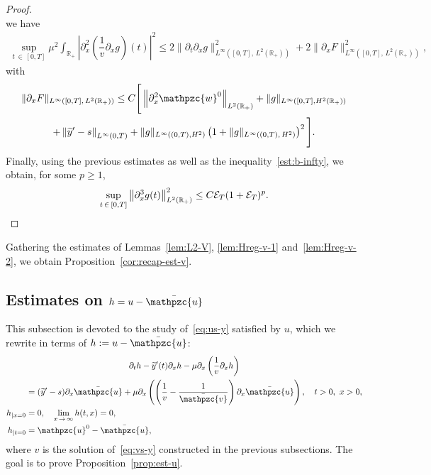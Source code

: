 \documentclass[AHL,Unicode,longabstracts,published]{cedram}
\newcommand{\R}{\mathbb{R}}
\newcommand{\p}{\partial}
\newcommand{\bv}{\bar{\mathpzc{v}}}
\newcommand{\bu}{\bar{\mathpzc{u}}}
\newcommand{\cE}{\mathcal E}
\newcommand{\tu}{\mathpzc{u}}
\newcommand{\tw}{\mathpzc{w}}
\newcommand{\ty}{\widetilde{y}}
\begin{document}
\begin{proof}
\begin{equation*}
\end{equation*}
we have
\begin{align*}
 \sup_{t\,\in\,[0,T]} \mu^2 \int_{\R_+}\left|\partial^2_x\left(\dfrac{1}{v} \partial_{x}g\right)(t)\right|^2 
\leq 2 \|\partial_t \partial_{x}g \|_{L^\infty\left([0,T],\,L^2(\R_+)\right)}^2 + 2 \| \partial_{x} F\|_{L^\infty\left([0,T],\,L^2(\R_+)\right)}^2,
\end{align*}
with
\begin{multline*}
\|\partial_x F\|_{L^\infty\left([0,T],\,L^2(\R_+)\right)}
\leq C \Bigg[\left\|\partial^2_x \tw^0\right\|_{L^2(\R_+)}
+\|g\|_{L^\infty\left([0,T], H^2(\R_+)\right)}  \\
+\left\|\ty' - s\right\|_{L^\infty(0,T)} + \|g\|_{L^\infty\left((0,T), H^2\right)}\left(1 +\|g\|_{L^\infty((0,T),\, H^2)}\right)^2
\Bigg].
\end{multline*}
Finally, using the previous estimates as well as the inequality~\eqref{est:b-infty}, we obtain, for some $p\geq 1$,
\[
\sup_{t\, \in\,[0,T]} \left\|\partial^3_x g (t)\right\|_{L^2(\R_+)}^2
\leq C \cE_T (1+ \cE_T)^p.\qedhere
\]
\end{proof}


Gathering the estimates of Lemmas~\ref{lem:L2-V}, \ref{lem:Hreg-v-1} and~\ref{lem:Hreg-v-2}, we obtain Proposition~\ref{cor:recap-est-v}.



\subsection{Estimates on \texorpdfstring{$h=u-\bu$}{h}}\label{sec:us}

This subsection is devoted to the study of~\eqref{eq:us-y} satisfied by $u$, which we rewrite in terms of $h:=u-\bu$:
\begin{multline}\label{eq:u}
\partial_t h - \ty'(t) \p_x h - \mu \partial_x\left(\dfrac{1}{v}\partial_x h \right)
\\
\begin{aligned}
&= (\ty'-s)\p_x \bu + \mu \p_x\left(\left(\frac{1}{v}- \frac{1}{\bv}\right) \p_x \bu\right),\quad t>0, \ x>0,\\
h_{|x=0} &=0, \quad \lim_{x\,\to\,\infty} h(t,x)=0,\\
h_{|t=0} &=\tu^0-\bu,
\end{aligned}
\end{multline}
where $v$ is the solution of~\eqref{eq:vs-y} constructed in the previous subsections. The goal is to prove Proposition~\ref{prop:est-u}.
\end{document}
